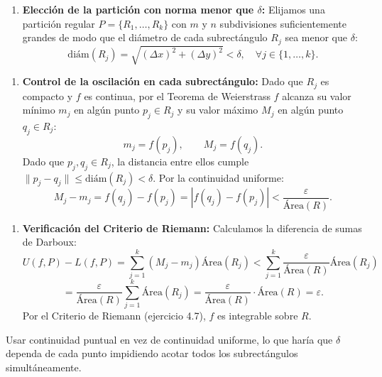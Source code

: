 \documentclass[11pt,a4paper]{article}
\begin{document}
\begin{enumerate}[label=\textbf{\arabic*.}]
\item \textbf{Elección de la partición con norma menor que $\delta$:}
Elijamos una partición regular $P = \{R_1, \dots, R_k\}$ con $m$ y $n$ subdivisiones suficientemente grandes de modo que el diámetro de cada subrectángulo $R_j$ sea menor que $\delta$:
\begin{equation*}
\text{diám}(R_j) = \sqrt{(\Delta x)^2 + (\Delta y)^2} < \delta, \quad \forall j \in \{1, \dots, k\}.
\end{equation*}
\end{enumerate}

\begin{enumerate}[label=\textbf{\arabic*.}]
\item \textbf{Control de la oscilación en cada subrectángulo:}
Dado que $R_j$ es compacto y $f$ es continua, por el Teorema de Weierstrass $f$ alcanza su valor mínimo $m_j$ en algún punto $p_j \in R_j$ y su valor máximo $M_j$ en algún punto $q_j \in R_j$:
\begin{equation*}
m_j = f(p_j), \qquad M_j = f(q_j).
\end{equation*}
Dado que $p_j, q_j \in R_j$, la distancia entre ellos cumple $\|p_j - q_j\| \le \text{diám}(R_j) < \delta$.
Por la continuidad uniforme:
\begin{equation*}
M_j - m_j = f(q_j) - f(p_j) = |f(q_j) - f(p_j)| < \frac{\varepsilon}{\text{Área}(R)}.
\end{equation*}
\end{enumerate}

\begin{enumerate}[label=\textbf{\arabic*.}]
\item \textbf{Verificación del Criterio de Riemann:}
Calculamos la diferencia de sumas de Darboux:
\begin{equation*}
U(f, P) - L(f, P) = \sum_{j=1}^k (M_j - m_j) \text{Área}(R_j) < \sum_{j=1}^k \frac{\varepsilon}{\text{Área}(R)} \text{Área}(R_j)
\end{equation*}
\begin{equation*}
= \frac{\varepsilon}{\text{Área}(R)} \sum_{j=1}^k \text{Área}(R_j) = \frac{\varepsilon}{\text{Área}(R)} \cdot \text{Área}(R) = \varepsilon.
\end{equation*}
Por el Criterio de Riemann (ejercicio 4.7), $f$ es integrable sobre $R$.
\end{enumerate}

\begin{trapbox}
Usar continuidad puntual en vez de continuidad uniforme, lo que haría que $\delta$ dependa de cada punto impidiendo acotar todos los subrectángulos simultáneamente.
\end{trapbox}
\end{document}
